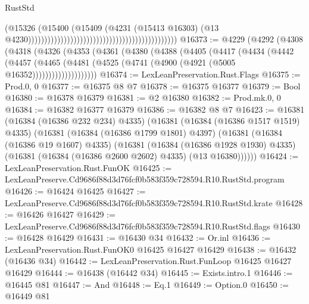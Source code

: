 \begin{lexlean}{RustStd}
\begin{coremodule}
                                                                                      (@15326
                                                                                        (@15400
                                                                                          (@15409
                                                                                            (@4231
                                                                                              (@15413
                                                                                                @16303)
                                                                                              (@13
                                                                                                @4230))))))))))))))))))))))))))))))))))))))))))))))
@16373 := @4229
    (@4292
      (@4308
        (@4318
          (@4326
            (@4353
              (@4361
                (@4380
                  (@4388
                    (@4405
                      (@4417
                        (@4434
                          (@4442
                            (@4457
                              (@4465
                                (@4481 (@4525 (@4741 (@4900 (@4921 (@5005 @16352))))))))))))))))))))
@16374 := LexLeanPreservation.Rust.Flags
@16375 := Prod.{0, 0}
@16377 := @16375 @8 @7
@16378 := @16375 @16377
@16379 := Bool
@16380 := @16378 @16379
@16381 := @2 @16380
@16382 := Prod.mk.{0, 0}
@16384 := @16382 @16377 @16379
@16386 := @16382 @8 @7
@16423 := @16381
    (@16384 (@16386 @232 @234) @4335)
    (@16381
      (@16384 (@16386 @1517 @1519) @4335)
      (@16381
        (@16384 (@16386 @1799 @1801) @4397)
        (@16381
          (@16384 (@16386 @19 @1607) @4335)
          (@16381
            (@16384 (@16386 @1928 @1930) @4335)
            (@16381 (@16384 (@16386 @2600 @2602) @4335) (@13 @16380))))))
@16424 := LexLeanPreservation.Rust.FunOK
@16425 := LexLeanPreserve.Cd9686f88d3d76fcf0b583f359c728594.R10.RustStd.program
@16426 := @16424 @16425
@16427 := LexLeanPreserve.Cd9686f88d3d76fcf0b583f359c728594.R10.RustStd.krate
@16428 := @16426 @16427
@16429 := LexLeanPreserve.Cd9686f88d3d76fcf0b583f359c728594.R10.RustStd.flags
@16430 := @16428 @16429
@16431 := @16430 @34
@16432 := Or.inl
@16436 := LexLeanPreservation.Rust.FunOK0 @16425 @16427 @16429
@16438 := @16432 (@16436 @34)
@16442 := LexLeanPreservation.Rust.FunLoop @16425 @16427 @16429
@16444 := @16438 (@16442 @34)
@16445 := Exists.intro.{1}
@16446 := @16445 @81
@16447 := And
@16448 := Eq.{1}
@16449 := Option.{0}
@16450 := @16449 @81

\end{coremodule}
\end{lexlean}
